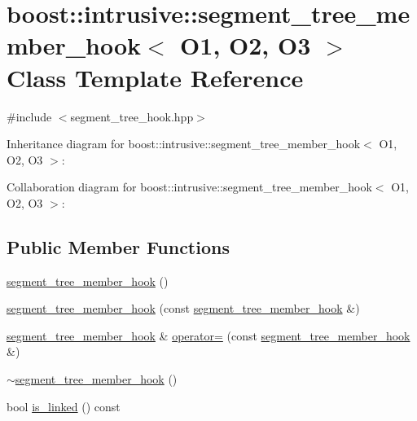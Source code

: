 \hypertarget{classboost_1_1intrusive_1_1segment__tree__member__hook}{}\section{boost\+:\+:intrusive\+:\+:segment\+\_\+tree\+\_\+member\+\_\+hook$<$ O1, O2, O3 $>$ Class Template Reference}
\label{classboost_1_1intrusive_1_1segment__tree__member__hook}


{\ttfamily \#include $<$segment\+\_\+tree\+\_\+hook.\+hpp$>$}



Inheritance diagram for boost\+:\+:intrusive\+:\+:segment\+\_\+tree\+\_\+member\+\_\+hook$<$ O1, O2, O3 $>$\+:


Collaboration diagram for boost\+:\+:intrusive\+:\+:segment\+\_\+tree\+\_\+member\+\_\+hook$<$ O1, O2, O3 $>$\+:
\subsection*{Public Member Functions}
\begin{DoxyCompactItemize}
\item 
\hyperlink{classboost_1_1intrusive_1_1segment__tree__member__hook_af6992ec25a4e0a1421f037fd6572e287}{segment\+\_\+tree\+\_\+member\+\_\+hook} ()
\item 
\hyperlink{classboost_1_1intrusive_1_1segment__tree__member__hook_aebb65dd4bf3d806ad865e695bd049a53}{segment\+\_\+tree\+\_\+member\+\_\+hook} (const \hyperlink{classboost_1_1intrusive_1_1segment__tree__member__hook}{segment\+\_\+tree\+\_\+member\+\_\+hook} \&)
\item 
\hyperlink{classboost_1_1intrusive_1_1segment__tree__member__hook}{segment\+\_\+tree\+\_\+member\+\_\+hook} \& \hyperlink{classboost_1_1intrusive_1_1segment__tree__member__hook_a318a273a207a6eb05882649e986b403e}{operator=} (const \hyperlink{classboost_1_1intrusive_1_1segment__tree__member__hook}{segment\+\_\+tree\+\_\+member\+\_\+hook} \&)
\item 
\hyperlink{classboost_1_1intrusive_1_1segment__tree__member__hook_aec7f97a1225f1623af0587dfb049fe79}{$\sim$segment\+\_\+tree\+\_\+member\+\_\+hook} ()
\item 
bool \hyperlink{classboost_1_1intrusive_1_1segment__tree__member__hook_ad0724b6dcff7e71fde0365fc04ceaca3}{is\+\_\+linked} () const
\end{DoxyCompactItemize}


